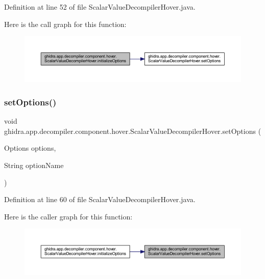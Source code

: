 Definition at line 52 of file Scalar\+Value\+Decompiler\+Hover.\+java.

Here is the call graph for this function\+:
\nopagebreak
\begin{figure}[H]
\begin{center}
\leavevmode
\includegraphics[width=350pt]{classghidra_1_1app_1_1decompiler_1_1component_1_1hover_1_1_scalar_value_decompiler_hover_a332d88d963bf72c85ed718bfd4bac6f0_cgraph}
\end{center}
\end{figure}
\mbox{\label{classghidra_1_1app_1_1decompiler_1_1component_1_1hover_1_1_scalar_value_decompiler_hover_aac09a7fe4aa79b17e25e0a0ebc3e1510}} 
\subsubsection{\texorpdfstring{setOptions()}{setOptions()}}
{\footnotesize\ttfamily void ghidra.\+app.\+decompiler.\+component.\+hover.\+Scalar\+Value\+Decompiler\+Hover.\+set\+Options (\begin{DoxyParamCaption}\item[{Options}]{options,  }\item[{String}]{option\+Name }\end{DoxyParamCaption})\hspace{0.3cm}{\ttfamily [inline]}}



Definition at line 60 of file Scalar\+Value\+Decompiler\+Hover.\+java.

Here is the caller graph for this function\+:
\nopagebreak
\begin{figure}[H]
\begin{center}
\leavevmode
\includegraphics[width=350pt]{classghidra_1_1app_1_1decompiler_1_1component_1_1hover_1_1_scalar_value_decompiler_hover_aac09a7fe4aa79b17e25e0a0ebc3e1510_icgraph}
\end{center}
\end{figure}


